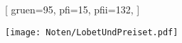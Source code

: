 [
    gruen={95}, 
    pfi={15}, 
    pfii={132},
]

\texttt{[image: Noten/LobetUndPreiset.pdf]}

\endsong

